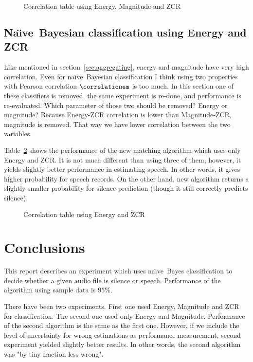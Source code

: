 \documentclass[english,11pt]{article}
\numberwithin{equation}{section}
\newcommand{\naive}{na\"{\i}ve\ }
\newcommand{\Naive}{Na\"{\i}ve\ }
\begin{document}
\begin{figure}
    \centering
    \caption{Correlation table using Energy, Magnitude and ZCR}
    \correlationtableemz
    \label{tab:correlation_table_emz}
\end{figure}

\subsection{\Naive Bayesian classification using Energy and ZCR}

Like mentioned in section~\ref{sec:aggregating}, energy and magnitude have very
high correlation. Even for \naive Bayesian classification I think using two
properties with Pearson correlation $\correlationem$ is too much. In this
section one of these classifiers is removed, the same experiment is re-done,
and performance is re-evaluated. Which parameter of those two should be
removed? Energy or magnitude? Because Energy-ZCR correlation is lower than
Magnitude-ZCR, magnitude is removed. That way we have lower correlation between
the two variables.

Table~\ref{tab:correlation_table_ez} shows the performance of the new matching
algorithm which uses only Energy and ZCR. It is not much different than using
three of them, however, it yields slightly better performance in estimating
speech. In other words, it gives higher probability for speech records. On the
other hand, new algorithm returns a slightly smaller probability for silence
prediction (though it still correctly predicts silence).

\begin{figure}
    \centering
    \caption{Correlation table using Energy and ZCR}
    \correlationtableez
    \label{tab:correlation_table_ez}
\end{figure}

\section{Conclusions}

This report describes an experiment which uses \naive Bayes classification
to decide whether a given audio file is silence or speech. Performance of the
algorithm using sample data is $95\%$.

There have been two experiments. First one used Energy, Magnitude and ZCR for
classification. The second one used only Energy and Magnitude. Performance of
the second algorithm is the same as the first one. However, if we include the
level of uncertainty for wrong estimations as performance measurement, second
experiment yielded slightly better results. In other words, the second algorithm
was "by tiny fraction less wrong".
\end{document}
